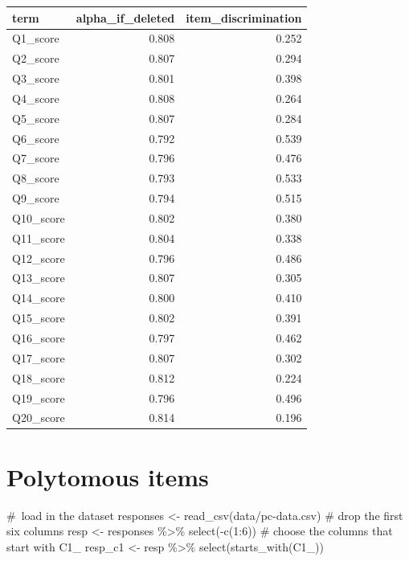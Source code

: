 \documentclass[
  letterpaper,
  DIV=11,
  numbers=noendperiod]{scrreprt}
\newenvironment{Shaded}{\begin{snugshade}}{\end{snugshade}}
\newcommand{\CommentTok}[1]{\textcolor[rgb]{0.37,0.37,0.37}{#1}}
\newcommand{\DecValTok}[1]{\textcolor[rgb]{0.68,0.00,0.00}{#1}}
\newcommand{\FunctionTok}[1]{\textcolor[rgb]{0.28,0.35,0.67}{#1}}
\newcommand{\NormalTok}[1]{\textcolor[rgb]{0.00,0.23,0.31}{#1}}
\newcommand{\OtherTok}[1]{\textcolor[rgb]{0.00,0.23,0.31}{#1}}
\newcommand{\SpecialCharTok}[1]{\textcolor[rgb]{0.37,0.37,0.37}{#1}}
\newcommand{\StringTok}[1]{\textcolor[rgb]{0.13,0.47,0.30}{#1}}
\begin{document}
\begin{longtable}[]{@{}lrr@{}}
\toprule\noalign{}
term & alpha\_if\_deleted & item\_discrimination \\
\midrule\noalign{}
\endhead
\bottomrule\noalign{}
\endlastfoot
Q1\_score & 0.808 & 0.252 \\
Q2\_score & 0.807 & 0.294 \\
Q3\_score & 0.801 & 0.398 \\
Q4\_score & 0.808 & 0.264 \\
Q5\_score & 0.807 & 0.284 \\
Q6\_score & 0.792 & 0.539 \\
Q7\_score & 0.796 & 0.476 \\
Q8\_score & 0.793 & 0.533 \\
Q9\_score & 0.794 & 0.515 \\
Q10\_score & 0.802 & 0.380 \\
Q11\_score & 0.804 & 0.338 \\
Q12\_score & 0.796 & 0.486 \\
Q13\_score & 0.807 & 0.305 \\
Q14\_score & 0.800 & 0.410 \\
Q15\_score & 0.802 & 0.391 \\
Q16\_score & 0.797 & 0.462 \\
Q17\_score & 0.807 & 0.302 \\
Q18\_score & 0.812 & 0.224 \\
Q19\_score & 0.796 & 0.496 \\
Q20\_score & 0.814 & 0.196 \\
\end{longtable}

\hypertarget{polytomous-items}{%
\section{Polytomous items}\label{polytomous-items}}

\begin{Shaded}
\begin{Highlighting}[]
\CommentTok{\# load in the dataset}
\NormalTok{responses }\OtherTok{\textless{}{-}} \FunctionTok{read\_csv}\NormalTok{(}\StringTok{\textquotesingle{}data/pc{-}data.csv\textquotesingle{}}\NormalTok{)}
\CommentTok{\# drop the first six columns}
\NormalTok{resp }\OtherTok{\textless{}{-}}\NormalTok{ responses }\SpecialCharTok{\%\textgreater{}\%} 
  \FunctionTok{select}\NormalTok{(}\SpecialCharTok{{-}}\FunctionTok{c}\NormalTok{(}\DecValTok{1}\SpecialCharTok{:}\DecValTok{6}\NormalTok{))}
\CommentTok{\# choose the columns that start with C1\_}
\NormalTok{resp\_c1 }\OtherTok{\textless{}{-}}\NormalTok{ resp }\SpecialCharTok{\%\textgreater{}\%} 
  \FunctionTok{select}\NormalTok{(}\FunctionTok{starts\_with}\NormalTok{(}\StringTok{\textquotesingle{}C1\_\textquotesingle{}}\NormalTok{))}
\end{Highlighting}
\end{Shaded}
\end{document}
